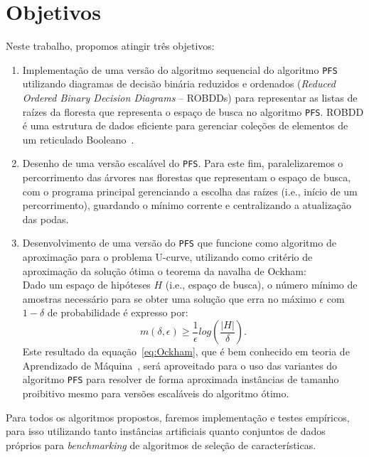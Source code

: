 \documentclass[12pt]{article}
\begin{document}
\section{Objetivos}
Neste trabalho, propomos atingir três objetivos:

\begin{enumerate}
\item Implementação de uma versão do algoritmo sequencial do algoritmo {\tt PFS} utilizando diagramas de decisão binária reduzidos e ordenados ({\em Reduced Ordered Binary Decision Diagrams} -- ROBDDs) para representar as listas de raízes da floresta que representa o espaço de busca no algoritmo {\tt PFS}. ROBDD é uma estrutura de dados eficiente para gerenciar coleções de elementos de um reticulado Booleano~\cite{bryant}.

\item Desenho de uma versão escalável do {\tt PFS}. Para este fim, paralelizaremos o percorrimento das
árvores nas florestas que representam o espaço de busca, com o programa
principal gerenciando a escolha das raízes (i.e., início de um 
percorrimento), guardando o mínimo corrente e centralizando a
atualização das podas.

\item Desenvolvimento de uma versão do {\tt PFS} que funcione como algoritmo 
de aproximação para o problema U-curve, utilizando como critério de
aproximação da solução ótima o teorema da navalha de Ockham:\\
\smallskip
Dado um espaço de hipóteses $H$ (i.e., espaço de busca), o número mínimo 
de amostras necessário para se obter uma solução que erra no máximo 
$\epsilon$ com $1 - \delta$ de probabilidade é expresso por:
\begin{equation}
\displaystyle  m(\delta,\epsilon) \ge 
    \frac{1}{\epsilon} log (\frac{|H|}{\delta}). \label{eq:Ockham}
\end{equation}
Este resultado da equação~\ref{eq:Ockham}, que é bem conhecido em teoria de Aprendizado de Máquina~\cite{kearns}, será aproveitado para o uso das variantes do algoritmo {\tt PFS} para resolver de forma aproximada instâncias de tamanho proibitivo mesmo para versões escaláveis do algoritmo ótimo.
\end{enumerate}

Para todos os algoritmos propostos, faremos implementação e testes empíricos, para isso utilizando tanto instâncias artificiais quanto conjuntos de dados próprios para {\em benchmarking} de algoritmos de seleção de características.
\end{document}
